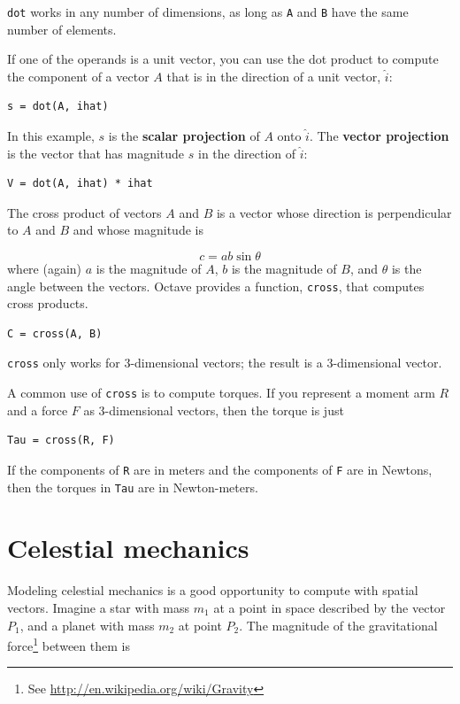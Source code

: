 \documentclass{book}
\begin{document}
{\tt dot} works in any number of dimensions, as long as {\tt A}
and {\tt B} have the same number of elements.

If one of the operands is a unit vector, you can use the dot
product to compute the component of a vector $A$ that is in
the direction of a unit vector, $\hat{i}$:

\begin{verbatim}
s = dot(A, ihat)
\end{verbatim}

In this example, $s$ is the {\bf scalar projection} of $A$
onto $\hat{i}$. The {\bf vector projection} is the vector
that has magnitude $s$ in the direction of $\hat{i}$:

\begin{verbatim}
V = dot(A, ihat) * ihat
\end{verbatim}

The cross product of vectors $A$ and $B$ is a vector whose direction
is perpendicular to $A$ and $B$ and whose magnitude is

\[ c = a b \sin \theta \]
%
where (again) $a$ is the magnitude of $A$, $b$ is the magnitude of
$B$, and $\theta$ is the angle between the vectors. Octave provides
a function, {\tt cross}, that computes cross products.

\begin{verbatim}
C = cross(A, B)
\end{verbatim}

{\tt cross} only works for 3-dimensional vectors; the result is
a 3-dimensional vector.

A common use of {\tt cross} is to compute torques. If you represent
a moment arm $R$ and a force $F$ as 3-dimensional vectors, then
the torque is just

\begin{verbatim}
Tau = cross(R, F)
\end{verbatim}

If the components of {\tt R} are in meters and the components
of {\tt F} are in Newtons, then the torques in {\tt Tau} are
in Newton-meters.



\section{Celestial mechanics}

Modeling celestial mechanics is a good opportunity
to compute with spatial vectors.
Imagine a star with mass $m_1$ at a point in space described by the
vector $P_1$, and a planet with mass $m_2$ at point $P_2$. The
magnitude of the gravitational force\footnote{See
\url{http://en.wikipedia.org/wiki/Gravity}} between them is
\end{document}
